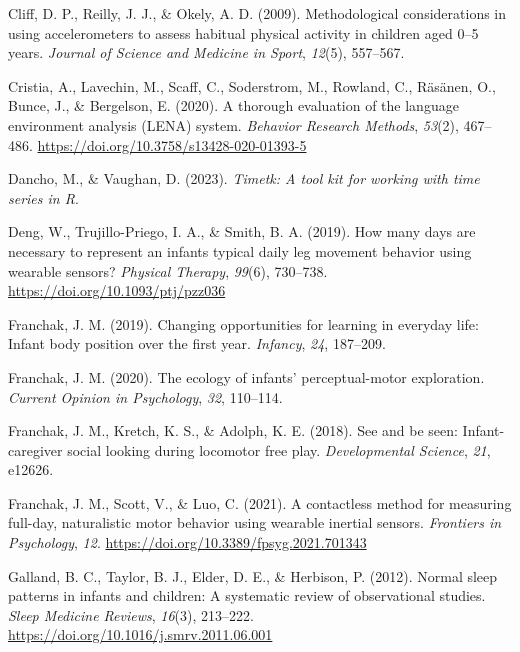 \documentclass[
  man]{apa6}
\newlength{\cslhangindent}
\newlength{\cslentryspacingunit} %
\newenvironment{CSLReferences}[2] %
 {%
  \setlength{\parindent}{0pt}
  \ifodd #1
  \let\oldpar\par
  \def\par{\hangindent=\cslhangindent\oldpar}
  \fi
  \setlength{\parskip}{#2\cslentryspacingunit}
 }%
 {}
\begin{document}
\begin{CSLReferences}{1}{0}
\leavevmode{}%
Cliff, D. P., Reilly, J. J., \& Okely, A. D. (2009). Methodological considerations in using accelerometers to assess habitual physical activity in children aged 0--5 years. \emph{Journal of Science and Medicine in Sport}, \emph{12}(5), 557--567.

\leavevmode{}%
Cristia, A., Lavechin, M., Scaff, C., Soderstrom, M., Rowland, C., Räsänen, O., Bunce, J., \& Bergelson, E. (2020). A thorough evaluation of the language environment analysis ({LENA}) system. \emph{Behavior Research Methods}, \emph{53}(2), 467--486. \url{https://doi.org/10.3758/s13428-020-01393-5}

\leavevmode{}%
Dancho, M., \& Vaughan, D. (2023). \emph{Timetk: A tool kit for working with time series in {R}}.

\leavevmode{}%
Deng, W., Trujillo-Priego, I. A., \& Smith, B. A. (2019). How many days are necessary to represent an infant{\textquotesingle}s typical daily leg movement behavior using wearable sensors? \emph{Physical Therapy}, \emph{99}(6), 730--738. \url{https://doi.org/10.1093/ptj/pzz036}

\leavevmode{}%
Franchak, J. M. (2019). Changing opportunities for learning in everyday life: Infant body position over the first year. \emph{Infancy}, \emph{24}, 187--209.

\leavevmode{}%
Franchak, J. M. (2020). The ecology of infants' perceptual-motor exploration. \emph{Current Opinion in Psychology}, \emph{32}, 110--114.

\leavevmode{}%
Franchak, J. M., Kretch, K. S., \& Adolph, K. E. (2018). See and be seen: Infant-caregiver social looking during locomotor free play. \emph{Developmental Science}, \emph{21}, e12626.

\leavevmode{}%
Franchak, J. M., Scott, V., \& Luo, C. (2021). A contactless method for measuring full-day, naturalistic motor behavior using wearable inertial sensors. \emph{Frontiers in Psychology}, \emph{12}. \url{https://doi.org/10.3389/fpsyg.2021.701343}

\leavevmode{}%
Galland, B. C., Taylor, B. J., Elder, D. E., \& Herbison, P. (2012). Normal sleep patterns in infants and children: A systematic review of observational studies. \emph{Sleep Medicine Reviews}, \emph{16}(3), 213--222. \url{https://doi.org/10.1016/j.smrv.2011.06.001}


\end{CSLReferences}
\end{document}
